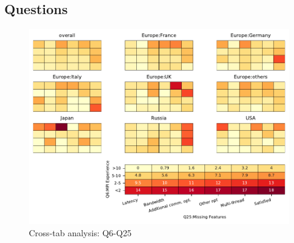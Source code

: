 
\subsection{Questions}


\begin{figure}
\begin{center}
\includegraphics[width=12cm]{../pdfs/Q6-Q25.pdf}
\caption{Cross-tab analysis: Q6-Q25}
\label{fig:Q6-Q25}
\end{center}
\end{figure}
